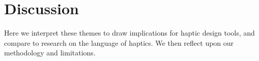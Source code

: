 
%
	



%
% 
\section{Discussion}
Here we interpret these themes to draw implications for haptic design tools, and compare to research on the language of haptics.
We then reflect upon our methodology and limitations.

